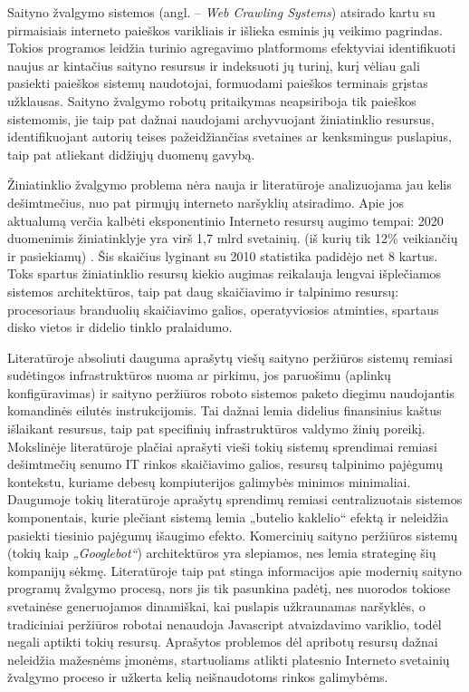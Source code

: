     Saityno žvalgymo sistemos (angl. -- \textit{Web Crawling Systems}) atsirado kartu su pirmaisiais interneto paieškos varikliais ir išlieka esminis jų veikimo pagrindas. Tokios programos leidžia turinio agregavimo platformoms efektyviai identifikuoti naujus ar kintačius saityno resursus ir indeksuoti jų turinį, kurį vėliau gali pasiekti paieškos sistemų naudotojai, formuodami paieškos terminais grįstas užklausas. Saityno žvalgymo robotų pritaikymas neapsiriboja tik paieškos sistemomis, jie taip pat dažnai naudojami archyvuojant žiniatinklio resursus, identifikuojant autorių teises pažeidžiančias svetaines ar kenksmingus puslapius, taip pat atliekant didžiųjų duomenų gavybą.
    
    
    Žiniatinklio žvalgymo problema nėra nauja ir literatūroje analizuojama jau kelis dešimtmečius, nuo pat pirmųjų interneto naršyklių atsiradimo. Apie jos aktualumą verčia kalbėti eksponentinio Interneto resursų augimo tempai: 2020 duomenimis žiniatinklyje yra virš 1,7 mlrd svetainių. (iš kurių tik 12\% veikiančių ir pasiekiamų) \cite{InternetLiveStats}. Šis skaičius lyginant su 2010 statistika padidėjo net 8 kartus. Toks spartus žiniatinklio resursų kiekio augimas reikalauja lengvai išplečiamos sistemos architektūros, taip pat daug skaičiavimo ir talpinimo resursų: procesoriaus branduolių skaičiavimo galios, operatyviosios atminties, spartaus disko vietos ir didelio tinklo pralaidumo.
    
    
    Literatūroje absoliuti dauguma aprašytų viešų saityno peržiūros sistemų remiasi sudėtingos infrastruktūros nuoma ar pirkimu, jos paruošimu (aplinkų konfigūravimas) ir saityno peržiūros roboto sistemos paketo diegimu naudojantis komandinės eilutės instrukcijomis. Tai dažnai lemia didelius finansinius kaštus išlaikant resursus, taip pat specifinių infrastruktūros valdymo žinių poreikį. Mokslinėje literatūroje plačiai aprašyti vieši tokių sistemų sprendimai remiasi dešimtmečių senumo IT rinkos skaičiavimo galios, resursų talpinimo pajėgumų kontekstu, kuriame debesų kompiuterijos galimybės minimos minimaliai. Daugumoje tokių literatūroje aprašytų sprendimų remiasi centralizuotais sistemos komponentais, kurie plečiant sistemą lemia „butelio kaklelio“ efektą ir neleidžia pasiekti tiesinio pajėgumų išaugimo efekto. Komercinių saityno peržiūros sistemų (tokių kaip \textit{„Googlebot“}) architektūros yra slepiamos, nes lemia strateginę šių kompanijų sėkmę. Literatūroje taip pat stinga informacijos apie modernių saityno programų žvalgymo procesą, nors jis tik pasunkina padėtį, nes nuorodos tokiose svetainėse generuojamos dinamiškai, kai puslapis užkraunamas naršyklės, o tradiciniai peržiūros robotai nenaudoja Javascript atvaizdavimo variklio, todėl negali aptikti tokių resursų. Aprašytos problemos dėl apribotų resursų dažnai neleidžia mažesnėms įmonėms, startuoliams atlikti platesnio Interneto svetainių žvalgymo proceso ir užkerta kelią neišnaudotoms rinkos galimybėms. 
    
